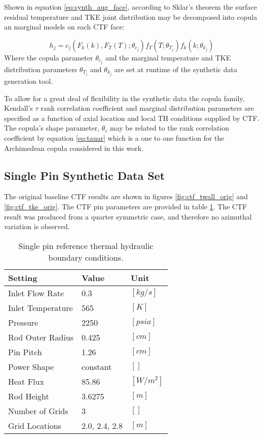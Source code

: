 Shown in equation \ref{eq:synth_aug_face}, according to Sklar's theorem the surface residual temperature and TKE joint distribution may be decomposed into copula an marginal models on each CTF face:

\begin{equation}
    h_j = c_j(F_k(k), F_T(T); \theta_{c_j}) f_{T}(T; \theta_{T_j}) f_{k}(k; \theta_{k_j})
    \label{eq:synth_aug_face}
\end{equation}
Where the copula parameter $\theta_{c_j}$ and the marginal temperature and TKE distribution parameters $\theta_{T_j}$ and $\theta_{k_j}$ are set at runtime of the synthetic data generation tool.

To allow for a great deal of flexibility in the synthetic data the copula family, Kendall's $\tau$ rank correlation coefficient and marginal distribution parameters are specified as a function of axial location and local TH conditions supplied by CTF.  The copula's shape parameter, $\theta_c$ may be related to the rank correlation coefficient by equation \ref{eq:tauar} which is a one to one function for the Archimedean copula considered in this work.


\subsection{Single Pin Synthetic Data Set}

The original baseline CTF results are shown in figures \ref{fig:ctf_twall_orig} and \ref{fig:ctf_tke_orig}.  The CTF pin parameters are provided in table \ref{tab:pin_settings}.  The CTF result was produced from a quarter symmetric case, and therefore no azimuthal variation is observed.

\begin{table}[h]
    \begin{center}
        \caption{Single pin reference thermal hydraulic boundary conditions.}
        \begin{tabular}{|l|l|l|}
            \hline
            Setting & Value & Unit \\
            \hline
            Inlet Flow Rate & 0.3 & $[kg/s]$ \\
            Inlet Temperature & 565 & $[K]$ \\
            Pressure & 2250 & $[psia]$ \\
            Rod Outer Radius & 0.425 & $[cm]$ \\
            Pin Pitch & 1.26 & $[cm]$ \\
            Power Shape & constant & $[]$ \\
            Heat Flux & 85.86  & $[W/m^2]$ \\
            Rod Height & 3.6275 & $[m]$ \\
            Number of Grids & 3  & $[]$ \\
            Grid Locations & 2.0, 2.4, 2.8 & $[m]$ \\
            \hline
        \end{tabular}
    \label{tab:pin_settings}
    \end{center}
\end{table}

